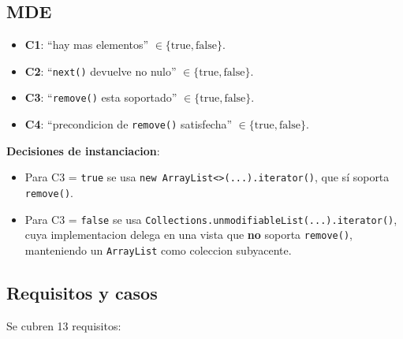 \documentclass[12pt,a4paper]{article}
\begin{document}
\subsection{MDE}

\begin{itemize}
  \item \textbf{C1}: ``hay mas elementos'' $\in \{\text{true}, \text{false}\}$.
  \item \textbf{C2}: ``\texttt{next()} devuelve no nulo'' $\in \{\text{true}, \text{false}\}$.
  \item \textbf{C3}: ``\texttt{remove()} esta soportado'' $\in \{\text{true}, \text{false}\}$.
  \item \textbf{C4}: ``precondicion de \texttt{remove()} satisfecha''
  $\in \{\text{true}, \text{false}\}$.
\end{itemize}

\noindent \textbf{Decisiones de instanciacion}:
\begin{itemize}
  \item Para C3 = \texttt{true} se usa \texttt{new ArrayList<>(...).iterator()}, que sí soporta
  \texttt{remove()}.
  \item Para C3 = \texttt{false} se usa \texttt{Collections.unmodifiableList(...).iterator()},
  cuya implementacion delega en una vista que \textbf{no} soporta \texttt{remove()}, manteniendo
  un \texttt{ArrayList} como coleccion subyacente.
\end{itemize}

\subsection{Requisitos y casos}

Se cubren 13 requisitos:
\end{document}
